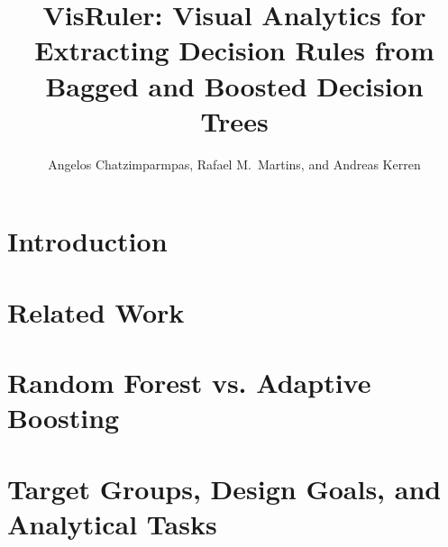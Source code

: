 \documentclass[Afour,sagev,times]{sagej}
\begin{document}

\title{VisRuler: Visual Analytics for Extracting Decision Rules from Bagged and Boosted Decision Trees}

\author{Angelos Chatzimparmpas, Rafael M.\ Martins, and Andreas Kerren}





\begin{abstract}

\end{abstract}


\maketitle

\section{Introduction} \label{sec:intro}
  

\section{Related Work} \label{sec:relwo}
  

\section{Random Forest vs. Adaptive Boosting} \label{sec:back}
  

\section{Target Groups, Design Goals, and Analytical Tasks} \label{sec:goals}
  
\end{document}
